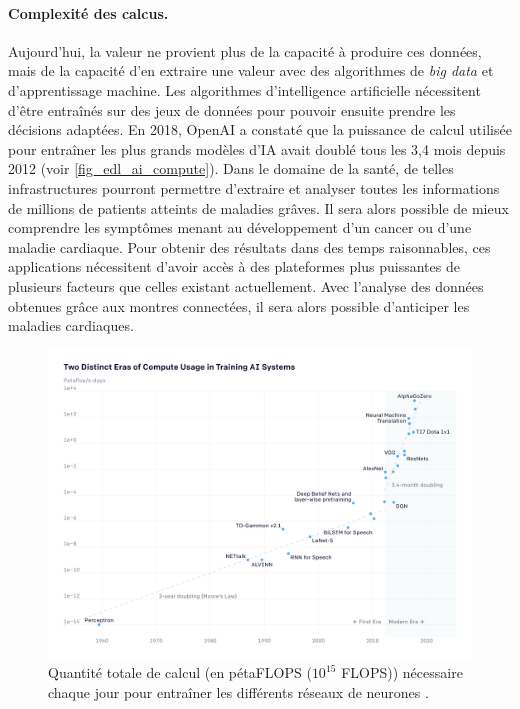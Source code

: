         

            
        \paragraph{Complexité des calcus.} 
             Aujourd'hui, la valeur ne provient plus de la capacité à produire ces données, mais de la capacité d'en extraire une valeur avec des algorithmes de \textit{big data} et d'apprentissage machine. Les algorithmes d'intelligence artificielle nécessitent d'être entraînés sur des jeux de données pour pouvoir ensuite prendre les décisions adaptées. En 2018, OpenAI a constaté que la puissance de calcul utilisée pour entraîner les plus grands modèles d'IA avait doublé tous les 3,4 mois depuis 2012 (voir \autoref{fig_edl_ai_compute}). Dans le domaine de la santé, de telles infrastructures pourront permettre d'extraire et analyser toutes les informations de millions de patients atteints de maladies grâves.  Il sera alors possible de mieux comprendre les symptômes menant au développement d'un cancer ou d'une maladie cardiaque. 
             Pour obtenir des résultats dans des temps raisonnables, ces applications nécessitent d'avoir accès à des plateformes plus puissantes de plusieurs facteurs que celles existant actuellement. Avec l'analyse des données obtenues grâce aux montres connectées, il sera alors possible d'anticiper les maladies cardiaques.
             
            \begin{figure}
            \center
            \includegraphics[width=14cm]{images/edl_ai_compute.png}
            \caption{\label{fig_edl_ai_compute} Quantité totale de calcul (en pétaFLOPS ($10^{15}$ \gls{FLOPS})) nécessaire chaque jour pour entraîner les différents réseaux de neurones \cite{amodei2ai}.}
            \end{figure}

